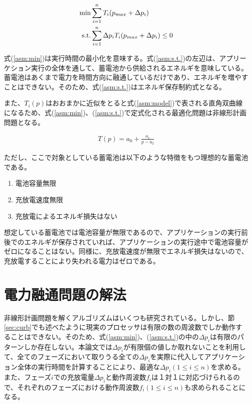 \begin{eqnarray}
{\rm min } & \sum_{i=1}^n T_i(p_{max} + \Delta p_i) \label{asm:min} \\
{\rm s.t. } & \sum_{i=1}^n \Delta p_i T_i(p_{max} + \Delta p_i) \leq 0 \label{asm:s.t.}
\end{eqnarray}

式(\ref{asm:min})は実行時間の最小化を意味する。式(\ref{asm:s.t.})の左辺は、アプリーケション実行の全体を通して、蓄電池から供給されるエネルギを意味している。蓄電池はあくまで電力を時間方向に融通しているだけであり、エネルギを増やすことはできない。そのため、式(\ref{asm:s.t.})はエネルギ保存制約式となる。

また、$T_i(p)$はおおまかに近似をとると式(\ref{asm:model})で表される直角双曲線になるため、式(\ref{asm:min})、(\ref{asm:s.t.})で定式化される最適化問題は非線形計画問題となる。

\begin{eqnarray}
T(p) = a_0 + \frac{a_1}{p-a_2} \label{asm:model}
\end{eqnarray}

ただし、ここで対象としている蓄電池は以下のような特徴をもつ理想的な蓄電池である。

\begin{enumerate}
\item 電池容量無限
\item 充放電速度無限
\item 充放電によるエネルギ損失はない
\end{enumerate}

想定している蓄電池では電池容量が無限であるので、アプリケーションの実行前後でのエネルギが保存されていれば、アプリケーションの実行途中で電池容量がゼロになることはない。同様に、充放電速度が無限でエネルギ損失はないので、充放電することにより失われる電力はゼロである。


\section{電力融通問題の解法}
\label{sec:algorithm}

非線形計画問題を解くアルゴリズムはいくつも研究されている。しかし、節\ref{sec:curb}でも述べたように現実のプロセッサは有限の数の周波数でしか動作することはできない。そのため、式(\ref{asm:min})、(\ref{asm:s.t.})の中の$\Delta p_i$は有限のパターンしか存在しない。本論文では$\Delta p_i$が有限個の値しか取れないことを利用して、全てのフェーズにおいて取りうる全ての$\Delta p_i$を実際に代入してアプリケーション全体の実行時間を計算することにより、最適な$\Delta p_i(1 \leq i \leq n)$を求める。また、フェーズ$i$での充放電量$\Delta p_i$と動作周波数$f_i$は１対１に対応づけられるので、それぞれのフェーズにおける動作周波数$f_i(1 \leq i \leq n)$も求められることになる。







